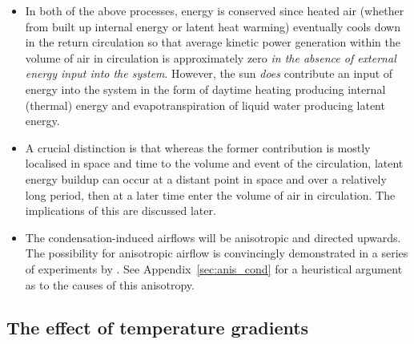 \begin{itemize}
\begin{itemize}
		\item In both of the above processes, energy is conserved since heated air (whether from built up internal energy or latent heat warming) eventually cools down in the return circulation so that average kinetic power generation within the volume of air in circulation is approximately zero \textit{in the absence of external energy input into the system}. However, the sun \textit{does} contribute an input of energy into the system in the form of daytime heating producing internal (thermal) energy and evapotranspiration of liquid water producing latent energy.
		\item A crucial distinction is that whereas the former contribution is mostly localised in space and time to the volume and event of the circulation, latent energy buildup can occur at a distant point in space and over a relatively long period, then at a later time enter the volume of air in circulation. The implications of this are discussed later.
		\item The condensation-induced airflows will be anisotropic and directed upwards. The possibility for anisotropic airflow is convincingly demonstrated in a series of experiments by \citet{bunyard2015, bunyard2017, bunyard2019}. See Appendix~\ref{sec:anis_cond} for a heuristical argument as to the causes of this anisotropy.
	\end{itemize}
\end{itemize}

\subsection{The effect of temperature gradients}

